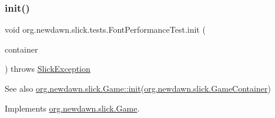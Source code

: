 \subsubsection{\texorpdfstring{init()}{init()}}
{\footnotesize\ttfamily void org.\+newdawn.\+slick.\+tests.\+Font\+Performance\+Test.\+init (\begin{DoxyParamCaption}\item[{\mbox{\hyperlink{classorg_1_1newdawn_1_1slick_1_1_game_container}{Game\+Container}}}]{container }\end{DoxyParamCaption}) throws \mbox{\hyperlink{classorg_1_1newdawn_1_1slick_1_1_slick_exception}{Slick\+Exception}}\hspace{0.3cm}{\ttfamily [inline]}}

\begin{DoxySeeAlso}{See also}
\mbox{\hyperlink{interfaceorg_1_1newdawn_1_1slick_1_1_game_ad2dd6affab08bb8fdb5fab0815957b7a}{org.\+newdawn.\+slick.\+Game\+::init}}(\mbox{\hyperlink{classorg_1_1newdawn_1_1slick_1_1_game_container}{org.\+newdawn.\+slick.\+Game\+Container}}) 
\end{DoxySeeAlso}


Implements \mbox{\hyperlink{interfaceorg_1_1newdawn_1_1slick_1_1_game_ad2dd6affab08bb8fdb5fab0815957b7a}{org.\+newdawn.\+slick.\+Game}}.


